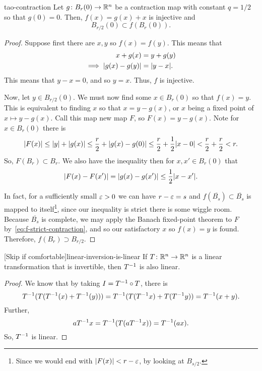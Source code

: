 \documentclass{article}
\begin{document}
\begin{lemma}{}{tao-contraction}
  Let $g \from B_{r}(0) \to \RR[n]$ be a contraction map with constant $q = 1/2$ so that $g(0) = 0$.
  Then, $f(x) = g(x) + x$ is injective and
  \[ B_{r/2}(0) \subset f(B_{r}(0)). \]
\end{lemma}
\begin{proof}
  Suppose first there are $x, y$ so $f(x) = f(y)$. This means that
  \begin{align*}
    x + g(x) &= y + g(y)\\
    \implies \abs{g(x) - g(y)} &= \abs{y - x}.
  \end{align*}
  This means that $y - x = 0$, and so $y = x$. Thus, $f$ is injective.

  Now, let $y \in B_{r/2}(0)$. We must now find some $x \in B_{r}(0)$ so that $f(x) = y$.
  This is equivalent to finding $x$ so that $x = y - g(x)$, or $x$ being a fixed point of $x \mapsto y - g(x)$.
  Call this map new map $F$, so $F(x) = y - g(x)$. Note for $x \in B_{r}(0)$ there is
  \[ \abs{F(x)} \le \abs{y} + \abs{g(x)} \le \frac{r}{2} + \abs{g(x) - g(0)} \le \frac{r}{2} + \frac{1}{2}\abs{x - 0} < \frac{r}{2} + \frac{r}{2} < r. \]
  So, $F(B_{r}) \subset B_{r}$.
  We also have the inequality then for $x, x' \in B_{r}(0)$ that
  \begin{equation}\label{eq:f-strict-contraction} \abs{F(x) - F(x')} = \abs{g(x) - g(x')} \le \frac{1}{2}\abs{x - x'}. \end{equation}

  In fact, for a sufficiently small $\eps > 0$ we can have $r - \eps = s$ and
  $f(\overline{B_{s}}) \subset \overline{B_{s}}$ is mapped to itself\footnote{Since we would end with $\abs{F(x)} < r - \eps$, by looking at $B_{s/2}$.},
  since our inequality is strict there is some wiggle room.
  Because $\overline{B_{s}}$ is complete, we may apply the Banach fixed-point theorem to $F$ by~\eqref{eq:f-strict-contraction},
  and so our satisfactory $x$ so $f(x) = y$ is found. Therefore, $f(B_{r}) \supset B_{r/2}$.
\end{proof}

\begin{lemma}{[Skip if comfortable]}{linear-inversion-is-linear}
  If $T \from \RR[n] \to \RR[n]$ is a linear transformation that is invertible,
  then $T\inv$ is also linear.
\end{lemma}
\begin{proof}
  We know that by taking $I = T\inv \circ T$, there is
  \[ T\inv(T(T\inv(x) + T\inv(y))) = T\inv(T(T\inv x) + T(T\inv y))
    = T\inv(x + y). \]
  Further,
  \[ a T\inv x = T\inv(T(a T\inv x)) = T\inv(a x). \]
  So, $T\inv$ is linear.
\end{proof}
\end{document}
